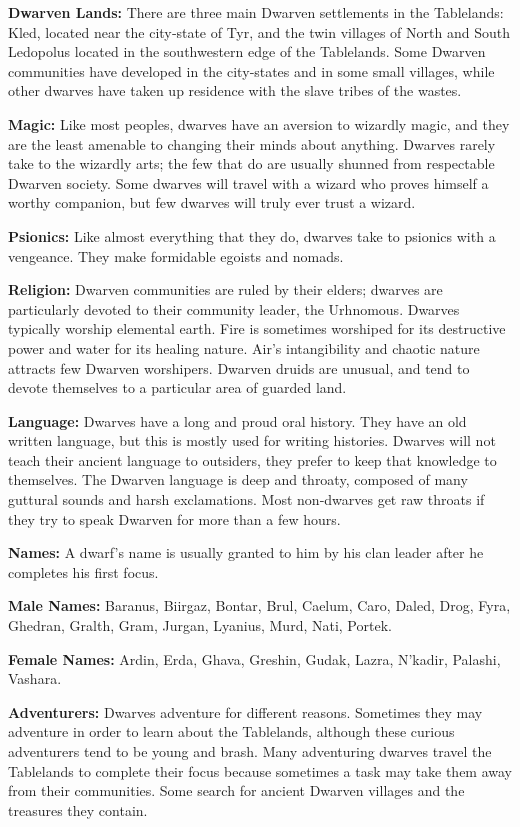 \textbf{Dwarven Lands:} There are three main Dwarven settlements in the Tablelands: Kled, located near the city‐state of Tyr, and the twin villages of North and South Ledopolus located in the southwestern edge of the Tablelands. Some Dwarven communities have developed in the city‐states and in some small villages, while other dwarves have taken up residence with the slave tribes of the wastes.

\textbf{Magic:} Like most peoples, dwarves have an aversion to wizardly magic, and they are the least amenable to changing their minds about anything. Dwarves rarely take to the wizardly arts; the few that do are usually shunned from respectable Dwarven society. Some dwarves will travel with a wizard who proves himself a worthy companion, but few dwarves will truly ever trust a wizard.

\textbf{Psionics:} Like almost everything that they do, dwarves take to psionics with a vengeance. They make formidable egoists and nomads.

\textbf{Religion:} Dwarven communities are ruled by their elders; dwarves are particularly devoted to their community leader, the Urhnomous. Dwarves typically worship elemental earth. Fire is sometimes worshiped for its destructive power and water for its healing nature. Air's intangibility and chaotic nature attracts few Dwarven worshipers. Dwarven druids are unusual, and tend to devote themselves to a particular area of guarded land.

\textbf{Language:} Dwarves have a long and proud oral history. They have an old written language, but this is mostly used for writing histories. Dwarves will not teach their ancient language to outsiders, they prefer to keep that knowledge to themselves. The Dwarven language is deep and throaty, composed of many guttural sounds and harsh exclamations. Most non‐dwarves get raw throats if they try to speak Dwarven for more than a few hours.

\textbf{Names:} A dwarf's name is usually granted to him by his clan leader after he completes his first focus.

\textbf{Male Names:} Baranus, Biirgaz, Bontar, Brul, Caelum, Caro, Daled, Drog, Fyra, Ghedran, Gralth, Gram, Jurgan, Lyanius, Murd, Nati, Portek.

\textbf{Female Names:} Ardin, Erda, Ghava, Greshin, Gudak, Lazra, N'kadir, Palashi, Vashara.

\textbf{Adventurers:} Dwarves adventure for different reasons. Sometimes they may adventure in order to learn about the Tablelands, although these curious adventurers tend to be young and brash. Many adventuring dwarves travel the Tablelands to complete their focus because sometimes a task may take them away from their communities. Some search for ancient Dwarven villages and the treasures they contain.

